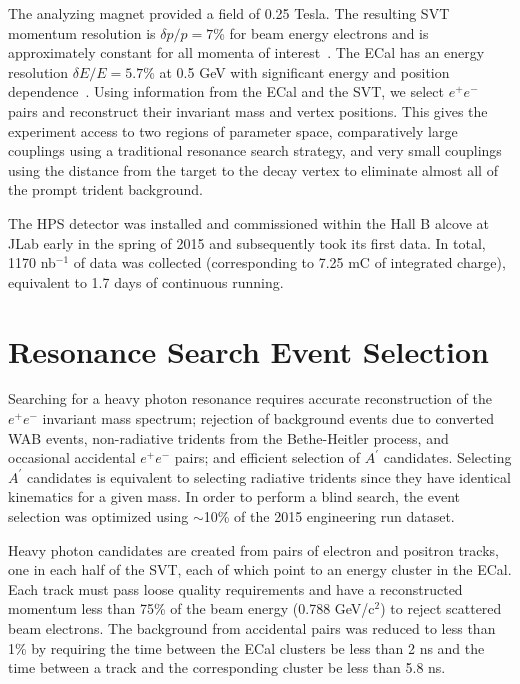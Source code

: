\documentclass[twocolumn, showpacs, preprintnumbers,prd, superscriptaddress]{revtex4-1}
\newcommand{\gevcc}{GeV/c$^2$}
\newcommand{\pos}{e^{+}}
\newcommand{\ele}{e^{-}}
\newcommand{\epem}{\pos\ele}
\newcommand{\aprime}{A^\prime}
\begin{document}
        The  analyzing magnet provided a field of 0.25 Tesla. The resulting
        SVT momentum resolution is $\delta p/p = 7$\% for beam energy electrons
        and is approximately constant for all momenta of 
        interest~\cite{Adrian:2018}. The ECal has an energy resolution 
        $\delta E/E = 5.7$\% at 0.5 GeV with significant energy and position
        dependence~\cite{Balossino:2016nly}. Using 
        information from the ECal and the SVT, we select $\epem$ pairs and
        reconstruct their invariant mass and vertex positions. This gives the
        experiment access to two regions of parameter space, comparatively
        large couplings using a traditional resonance search strategy, and very small 
        couplings using the distance from the target to the decay vertex to
        eliminate almost all of the prompt 
        trident background.      
        
        The HPS detector was installed and commissioned within the Hall B
        alcove at JLab early in the spring of 2015 and subsequently took its
        first data.  In total, 1170 nb$^{-1}$ of data was collected 
        (corresponding to 7.25 mC of integrated charge), equivalent to 
        1.7 days of continuous running. 

\section{Resonance Search Event Selection}\label{sec:bhselection}
    
    	Searching for a heavy photon resonance requires accurate
        reconstruction of the $\epem$ invariant mass spectrum; 
        rejection of background events due to converted WAB events, non-radiative
        tridents from the Bethe-Heitler process, 
        and occasional accidental $\epem$ pairs; and efficient selection of $\aprime$ candidates.     
        Selecting $\aprime$ candidates is equivalent to selecting
        radiative tridents since they have identical kinematics for a
        given mass. In order to perform a blind search, the event selection  was 
        optimized using $\sim$10\% of the 2015 engineering run dataset.
        
        Heavy photon candidates are created from pairs of electron and positron
        tracks, one in each half of the SVT, each of which point to an energy  
        cluster in the ECal.  Each track must pass loose quality requirements
        and have a reconstructed momentum less than 75\% of the beam energy
        (0.788 \gevcc) to reject scattered beam electrons.  The background from 
        accidental pairs was reduced to less than 1\% by requiring the time between 
        the ECal clusters be less than 2 ns and the time between a track and the
        corresponding cluster be less than 5.8 ns.
        
\end{document}
